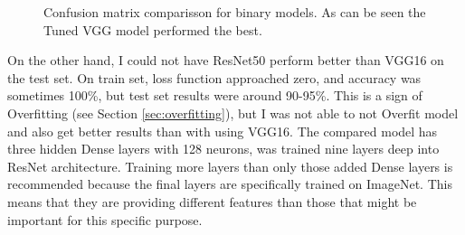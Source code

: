 \documentclass[thesis=B,english]{FITthesis}[2019/12/23]
\begin{document}
\begin{figure}
\caption[Confusion matrix comparisson for binary models]{Confusion matrix comparisson for binary models. As can be seen the Tuned VGG model performed the best. } \label{fig:binary_confusion}
\end{figure}
On the other hand, I could not have ResNet50 perform better than VGG16 on the test set. On train set, loss function approached zero, and accuracy was sometimes 100\%, but test set results were around 90-95\%. This is a sign of Overfitting (see Section \ref{sec:overfitting}), but I was not able to not Overfit model and also get better results than with using VGG16. The compared model has three hidden Dense layers with 128 neurons, was trained nine layers deep into ResNet architecture. Training more layers than only those added Dense layers is recommended because the final layers are specifically trained on ImageNet. This means that they are providing different features than those that might be important for this specific purpose. 
\end{document}
